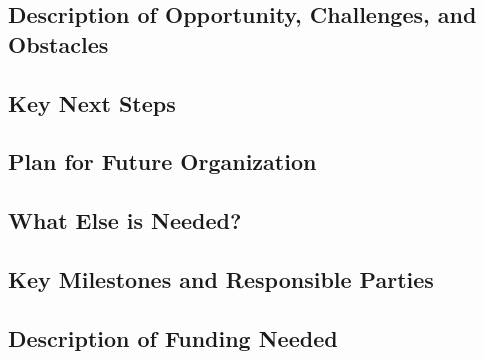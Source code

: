 \subsection{Description of Opportunity, Challenges, and Obstacles}


\subsection{Key Next Steps}


\subsection{Plan for Future Organization}


\subsection{What Else is Needed?}


\subsection{Key Milestones and Responsible Parties}


\subsection{Description of Funding Needed}

